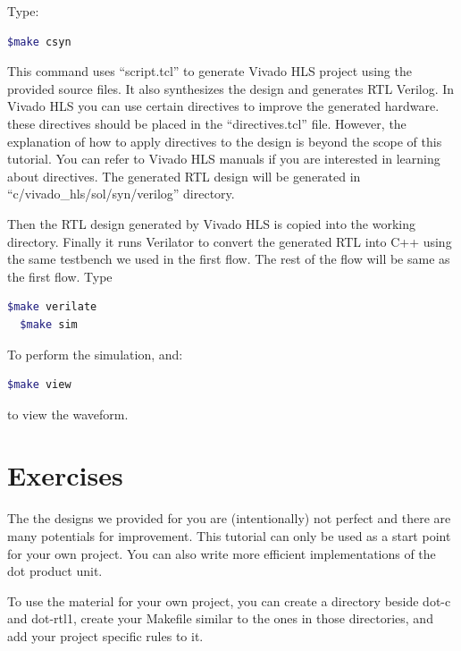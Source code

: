 \documentclass[12pt]{article}
\begin{document}
Type: 
\begin{lstlisting}[language=bash]
  $make csyn
\end{lstlisting}

This command uses “script.tcl” to generate Vivado HLS project using
the provided source files. It also synthesizes the design and
generates RTL Verilog. In Vivado HLS you can use certain directives to
improve the generated hardware. these directives should be placed in
the “directives.tcl” file. However, the explanation of how to apply
directives to the design is beyond the scope of this tutorial. You can
refer to Vivado HLS manuals if you are interested in learning about
directives. The generated RTL design will be generated in
“c/vivado\_hls/sol/syn/verilog” directory.

Then the RTL design generated by Vivado HLS is copied into the working
directory.  Finally it runs Verilator to convert the generated RTL
into C++ using the same testbench we used in the first flow. The rest
of the flow will be same as the first flow. Type
\begin{lstlisting}[language=bash]
  $make verilate
  $make sim
\end{lstlisting}

To perform the simulation, and:

\begin{lstlisting}[language=bash]
  $make view
\end{lstlisting}

to view the waveform.


\section{Exercises}

The the designs we provided for you are (intentionally) not perfect
and there are many potentials for improvement. This tutorial can only
be used as a start point for your own project. You can also write more
efficient implementations of the dot product unit.

To use the material for your own project, you can create a directory
beside dot-c and dot-rtl1, create your Makefile similar to the ones in
those directories, and add your project specific rules to it.
\end{document}
